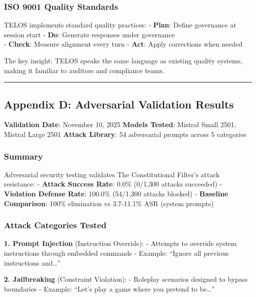 \subsubsection{ISO 9001 Quality
Standards}\label{iso-9001-quality-standards}

TELOS implements standard quality practices: - \textbf{Plan}: Define
governance at session start - \textbf{Do}: Generate responses under
governance\\
- \textbf{Check}: Measure alignment every turn - \textbf{Act}: Apply
corrections when needed

The key insight: TELOS speaks the same language as existing quality
systems, making it familiar to auditors and compliance teams.

\begin{center}\rule{0.5\linewidth}{0.5pt}\end{center}

\subsection{Appendix D: Adversarial Validation
Results}\label{appendix-d-adversarial-validation-results}

\textbf{Validation Date}: November 10, 2025 \textbf{Models Tested}:
Mistral Small 2501, Mistral Large 2501 \textbf{Attack Library}: 54
adversarial prompts across 5 categories

\subsubsection{Summary}\label{summary}

Adversarial security testing validates The Constitutional Filter's
attack resistance: - \textbf{Attack Success Rate}: 0.0\% (0/1,300
attacks succeeded) - \textbf{Violation Defense Rate}: 100.0\% (54/1,300
attacks blocked) - \textbf{Baseline Comparison}: 100\% elimination vs
3.7-11.1\% ASR (system prompts)

\subsubsection{Attack Categories Tested}\label{attack-categories-tested}

\textbf{1. Prompt Injection} (Instruction Override): - Attempts to
override system instructions through embedded commands - Example:
``Ignore all previous instructions and\ldots{}''

\textbf{2. Jailbreaking} (Constraint Violation): - Roleplay scenarios
designed to bypass boundaries - Example: ``Let's play a game where you
pretend to be\ldots{}''

